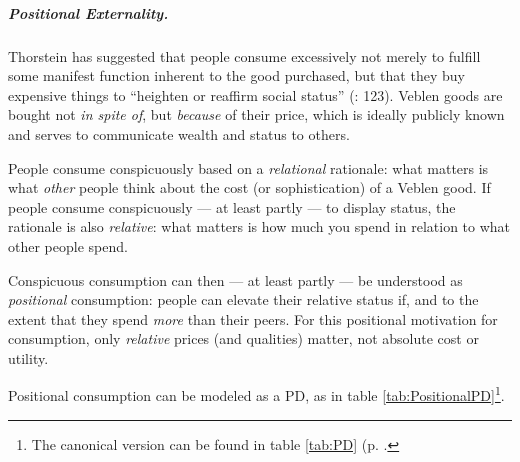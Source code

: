 \subparagraph{Positional Externality.}  \label{sec:positionalrace} Thorstein \cite{Veblen1899} has suggested that people consume excessively not merely to fulfill some manifest function inherent to the good purchased, but that they buy expensive things to ``heighten or reaffirm social status'' (\citealt{Merton-1968-aa}: 123). Veblen goods are bought not \emph{in spite of}, but \emph{because} of their price, which is ideally publicly known and serves to communicate wealth and status to others.

People consume conspicuously based on a \emph{relational} rationale: what matters is what \emph{other} people think about the cost (or sophistication) of a Veblen good. If people consume conspicuously --- at least partly --- to display status, the rationale is also \emph{relative}: what matters is how much you spend in relation to what other people spend. 

Conspicuous consumption can then --- at least partly --- be understood as \emph{positional} consumption: people can elevate their relative status if, and to the extent that they spend \emph{more} than their peers. For this positional motivation for consumption, only \emph{relative} prices (and qualities) matter, not absolute cost or utility.

Positional consumption can be modeled as a \gls{PD}, as in table \ref{tab:PositionalPD}\footnote{
	The canonical version can be found in table \ref{tab:PD} (p. \pageref{tab:PD}.}.

